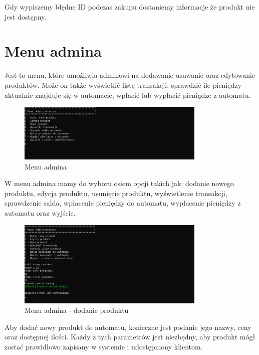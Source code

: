 Gdy wypiszemy błędne ID podczas zakupu dostaniemy informacje że produkt nie jest dostępny.


\newpage

 
\section{Menu admina}

Jest to menu, które umożliwia adminowi na dodawanie usuwanie oraz edytowanie produktów. Może on także wyświetlić listę transakcji, sprawdzić ile pieniędzy aktualnie znajduje się w automacie, wpłacić lub wypłacić pieniądze z automatu.

\begin{figure}[H] 
    \centering
    \includegraphics[width=0.8\textwidth]{grafiki/menu_admin.png}
    \caption{\footnotesize Menu admina}	
    \label{fig:5.8}
\end{figure}

W menu admina mamy do wyboru osiem opcji takich jak: dodanie nowego produktu, edycja produktu, usunięcie produktu, wyświetlenie transakcji, sprawdzenie salda, wpłacenie pieniędzy do automatu, wypłacenie pieniędzy z automatu oraz wyjście.



\begin{figure}[H] 
    \centering
    \includegraphics[width=0.8\textwidth]{grafiki/dodanie_produktu.png}
    \caption{\footnotesize Menu admina - dodanie produktu}	
    \label{fig:5.9}
\end{figure}
Aby dodać nowy produkt do automatu, konieczne jest podanie jego nazwy, ceny oraz dostępnej ilości. Każdy z tych parametrów jest niezbędny, aby produkt mógł zostać prawidłowo zapisany w systemie i udostępniony klientom.


